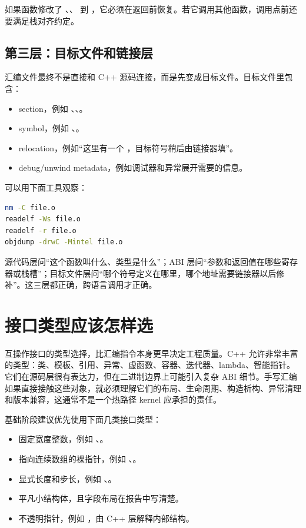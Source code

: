 如果函数修改了 、、 到 ，它必须在返回前恢复。若它调用其他函数，调用点前还要满足栈对齐约定。

\subsection{第三层：目标文件和链接层}

汇编文件最终不是直接和 C++ 源码连接，而是先变成目标文件。目标文件里包含：

\begin{itemize}
  \item section，例如 、、。
  \item symbol，例如 、。
  \item relocation，例如“这里有一个 ，目标符号稍后由链接器填”。
  \item debug/unwind metadata，例如调试器和异常展开需要的信息。
\end{itemize}

可以用下面工具观察：

\begin{lstlisting}[language=bash]
nm -C file.o
readelf -Ws file.o
readelf -r file.o
objdump -drwC -Mintel file.o
\end{lstlisting}

\begin{mentalmodel}
源代码层问“这个函数叫什么、类型是什么”；ABI 层问“参数和返回值在哪些寄存器或栈槽”；目标文件层问“哪个符号定义在哪里，哪个地址需要链接器以后修补”。这三层都正确，跨语言调用才正确。
\end{mentalmodel}

\section{接口类型应该怎样选}

互操作接口的类型选择，比汇编指令本身更早决定工程质量。C++ 允许非常丰富的类型：类、模板、引用、异常、虚函数、容器、迭代器、lambda、智能指针。它们在源码层很有表达力，但在二进制边界上可能引入复杂 ABI 细节。手写汇编如果直接接触这些对象，就必须理解它们的布局、生命周期、构造析构、异常清理和版本兼容，这通常不是一个热路径 kernel 应承担的责任。

基础阶段建议优先使用下面几类接口类型：

\begin{itemize}
  \item 固定宽度整数，例如 、。
  \item 指向连续数组的裸指针，例如 、。
  \item 显式长度和步长，例如 、。
  \item 平凡小结构体，且字段布局在报告中写清楚。
  \item 不透明指针，例如 ，由 C++ 层解释内部结构。
\end{itemize}

